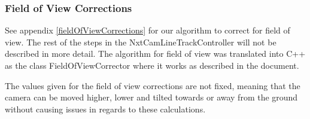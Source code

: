 





\subsubsection{Field of View Corrections}
See appendix \ref{fieldOfViewCorrections} for our algorithm to correct for field of view. The rest of the steps in the NxtCamLineTrackController will not be described in more detail. The algorithm for field of view was translated into C++ as the class FieldOfViewCorrector where it works as described in the document. 

The values given for the field of view corrections are not fixed, meaning that the camera can be moved higher, lower and tilted towards or away from the ground without causing issues in regards to these calculations. 